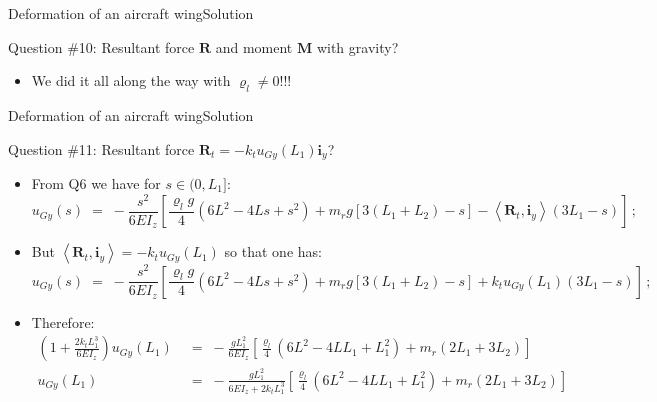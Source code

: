 \documentclass{beamer}
\newcommand{\uj}{u}
\newcommand{\yj}{y}
\newcommand{\zj}{z}
\renewcommand{\ij}{i}
\newcommand{\iv}{{\boldsymbol\ij}}
\newcommand{\roi}{\varrho}
\newcommand{\Fresj}{R}
\newcommand{\Mresj}{M}
\newcommand{\Fres}{{\boldsymbol\Fresj}}
\newcommand{\Mres}{{\boldsymbol\Mresj}}
\newcommand{\scal}[1]{\left\langle{#1}\right\rangle}
\begin{document}
\begin{frame}{Deformation of an aircraft wing}{Solution}

\vskip-50pt
\begin{exampleblock}{Question \#10: Resultant force $\Fres$ and moment $\Mres$ with gravity?}
\begin{itemize}
\item We did it all along the way with $\roi_l\neq 0$!!!
\end{itemize}
\end{exampleblock}

\end{frame}

\begin{frame}{Deformation of an aircraft wing}{Solution}

\begin{overprint}

\vskip-20pt
\begin{exampleblock}{Question \#11: Resultant force $\Fres_t=-k_t\uj_{G\yj}(L_1)\iv_\yj$?}
\begin{itemize}
\item From Q6 we have for $s\in(0,L_1]$:
\begin{displaymath}
\!\!\!\!\!\!\!\!\!\!\!\!\!\scriptstyle \uj_{G\yj}(s)\;=\scriptstyle\; -\frac{s^2}{6EI_\zj}\left[\frac{\roi_l g}{4}(6L^2-4Ls+s^2)+m_r g[3(L_1+L_2)-s]-\scal{\Fres_t,\iv_\yj}(3L_1-s)\right]\,;
\end{displaymath}
\item But $\scal{\Fres_t,\iv_\yj}=-k_t\uj_{G\yj}(L_1)$ so that one has:
\begin{displaymath}
\!\!\!\!\!\!\!\!\!\!\!\!\!\scriptstyle \uj_{G\yj}(s)\; =\scriptstyle\; -\frac{s^2}{6EI_\zj}\left[\frac{\roi_l g}{4}(6L^2-4Ls+s^2)+m_r g[3(L_1+L_2)-s]+k_t\uj_{G\yj}(L_1)(3L_1-s)\right]\,;
\end{displaymath}
\item Therefore:
\begin{displaymath}
\begin{split}
\!\!\!\!\!\!\!\!\!\!\!\!\!\scriptstyle \left(1+\frac{2k_tL_1^3}{6EI_\zj}\right)\uj_{G\yj}(L_1)\; &= \scriptstyle\; -\frac{gL_1^2}{6EI_\zj}\left[\frac{\roi_l}{4}(6L^2-4LL_1+L_1^2)+m_r(2L_1+3L_2)\right] \\
\scriptstyle \uj_{G\yj}(L_1)\; &= \scriptstyle\; -\frac{gL_1^2}{6EI_\zj+2k_tL_1^3}\left[\frac{\roi_l}{4}(6L^2-4LL_1+L_1^2)+m_r(2L_1+3L_2)\right] \\
\end{split}
\end{displaymath}
\end{itemize}
\end{exampleblock}


\end{overprint}
\end{frame}
\end{document}
